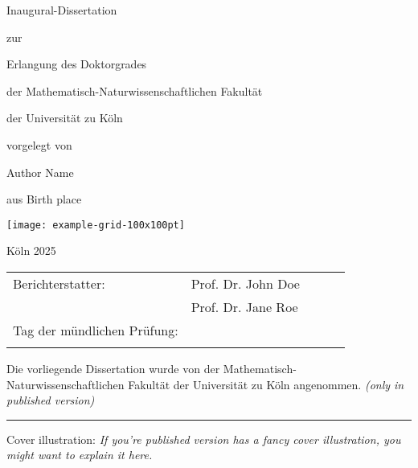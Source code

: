 \begin{titlepage}
\renewcommand{\footnotesize}{\small}
\renewcommand{\footnoterule}{\relax}

\thispagestyle{empty}
\renewcommand{\baselinestretch}{1} 
\begin{center}
	{\vspace*{1mm} \Huge {\color{accentcolor2} } \par}
	{ \Large \vspace*{20mm} {\LARGE \mainsemibold Inaugural-Dissertation} \par \vspace*{4mm} zur \par \vspace*{4mm} Erlangung des Doktorgrades \par \vspace*{4mm} der Mathematisch-Naturwissenschaftlichen Fakultät \par \vspace*{4mm} der Universität zu Köln \par \vspace*{4mm} vorgelegt von \par  \vspace*{15mm}}
	{{\LARGE \mainsemibold Author Name} \par \vspace*{10mm}}
	{\large \vspace*{1ex} aus Birth place \par \vspace*{1ex}}
	{\vspace*{10mm} {\texttt{[image: example-grid-100x100pt]}} \vspace*{10mm} \par}
	{\large K\"oln 2025}
\end{center}
\end{titlepage}


\thispagestyle{empty}
\begin{center}
\setlength{\tabcolsep}{2em} %
\begin{tabular}{lllll}
	Berichterstatter:           & Prof. Dr. John Doe &  &  &  \\[1em]
	& Prof. Dr. Jane Roe  &  &  &  \\[2em]
	Tag der mündlichen Prüfung: &             &  &  &  \\
	&                        &  &  & 
\end{tabular}
\end{center}

\vfill
Die vorliegende Dissertation wurde von der Mathematisch-Naturwissenschaftlichen Fakult\"at der Universit\"at zu K\"oln angenommen. \emph{\color{lightgray}(only in published version)} \\
\hrule
\vspace{.3cm}
{\noindent \scriptsize Cover illustration: \emph{\color{lightgray} If you're published version has a fancy cover illustration, you might want to explain it here.}}